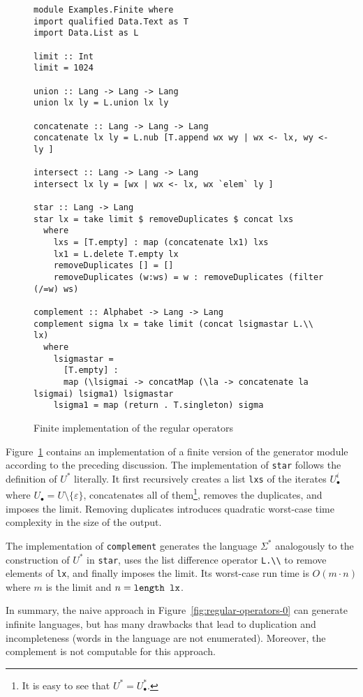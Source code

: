 \begin{figure}[tp]
\begin{lstlisting}
module Examples.Finite where
import qualified Data.Text as T
import Data.List as L

limit :: Int
limit = 1024

union :: Lang -> Lang -> Lang
union lx ly = L.union lx ly

concatenate :: Lang -> Lang -> Lang
concatenate lx ly = L.nub [T.append wx wy | wx <- lx, wy <- ly ]

intersect :: Lang -> Lang -> Lang
intersect lx ly = [wx | wx <- lx, wx `elem` ly ]

star :: Lang -> Lang
star lx = take limit $ removeDuplicates $ concat lxs
  where
    lxs = [T.empty] : map (concatenate lx1) lxs
    lx1 = L.delete T.empty lx
    removeDuplicates [] = []
    removeDuplicates (w:ws) = w : removeDuplicates (filter (/=w) ws)

complement :: Alphabet -> Lang -> Lang
complement sigma lx = take limit (concat lsigmastar L.\\ lx) 
  where
    lsigmastar =
      [T.empty] : 
      map (\lsigmai -> concatMap (\la -> concatenate la lsigmai) lsigma1) lsigmastar
    lsigma1 = map (return . T.singleton) sigma
\end{lstlisting}
  \caption{Finite implementation of the regular operators}
  \label{fig:finite-regular-operators}
\end{figure}
Figure~\ref{fig:finite-regular-operators} contains an implementation
of a finite version of the generator module according to the preceding
discussion. The implementation of \texttt{star} follows the definition
of $U^*$ literally. It first recursively creates a list \texttt{lxs}
of the iterates $U_\bullet^i$ where
$U_\bullet = U \setminus \{\varepsilon\}$, concatenates all of
them\footnote{It is easy to see that $U^* = U_\bullet^*$.}, removes
the duplicates, and imposes the limit. Removing duplicates introduces
quadratic worst-case time complexity in the size of the output.

The implementation of \texttt{complement} generates the language
$\Sigma^*$ analogously to the construction of $U^*$ in
\texttt{star}, uses the list difference operator
\texttt{L.\textbackslash\textbackslash} to remove elements of
\texttt{lx}, and finally imposes the limit. Its worst-case run time is
$O(m\cdot n)$ where $m$ is the limit and $n = \code{length lx}$.

In summary, the naive approach in
Figure~\ref{fig:regular-operators-0} can generate infinite languages,
but has many drawbacks that lead to duplication and incompleteness
(words in the language are not enumerated). Moreover, the complement
is not computable for this approach.

